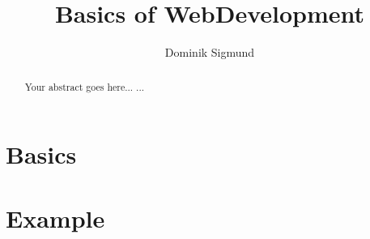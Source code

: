 \documentclass[12pt]{book}
\author{Dominik Sigmund}
\title{Basics of WebDevelopment}
\begin{document}
\maketitle

\begin{abstract}
Your abstract goes here...
...
\end{abstract}

\tableofcontents

\part{Basics}










\part{Example}
\end{document}
